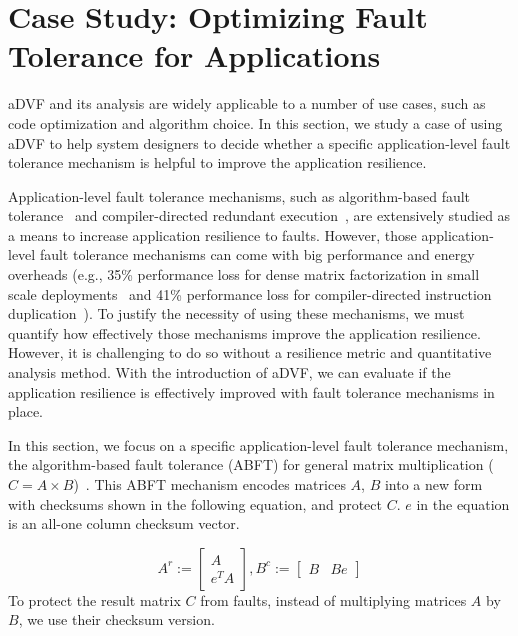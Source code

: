 \section{Case Study: Optimizing Fault Tolerance for Applications}
\label{sec:case_study}
aDVF and its analysis are widely applicable to a number of use cases, such as
code optimization and algorithm choice.
In this section, we study a case of using aDVF to help system designers to decide whether a specific application-level fault tolerance mechanism is helpful to improve the application resilience.

Application-level fault tolerance mechanisms, such as algorithm-based fault tolerance~\cite{abft_ecc:SC13, 21-chen2011algorithm, jcs13:wu, ics11:davies, hpdc13:davies, tc84_abft} and compiler-directed redundant execution~\cite{cgo05:reis, date05:hu, pact10:zhang, cgo07:wang, tr02:oh}, are extensively studied as a means to increase application resilience to faults. However, those application-level fault tolerance mechanisms can come with big performance and energy overheads 
(e.g., 35\% performance loss for dense matrix factorization in small scale deployments~\cite{ftfactor_ppopp12} and 41\% performance loss for compiler-directed instruction duplication~\cite{tr02:oh}). 
To justify the necessity of using these mechanisms, we must quantify how effectively those mechanisms improve the application resilience.
However, it is challenging to do so without a resilience metric and quantitative analysis method. 
With the introduction of aDVF, we can evaluate if the application resilience is effectively improved with fault tolerance mechanisms in place.

In this section, we focus on a specific application-level fault tolerance mechanism,
the algorithm-based fault tolerance (ABFT) for general matrix multiplication ($C=A \times B$)~\cite{jcs13:wu}.
This ABFT mechanism encodes matrices $A$, $B$ into a new form with checksums shown in the following equation, and protect $C$.
$e$ in the equation is an all-one column checksum vector. 

\scriptsize
\[ A^r:=\begin{bmatrix}A\\e^TA\end{bmatrix},
B^c:=\begin{bmatrix}B&Be\end{bmatrix} \]
\normalsize
To protect the result matrix $C$ from faults, instead of multiplying matrices $A$ by $B$, we use their checksum version.

